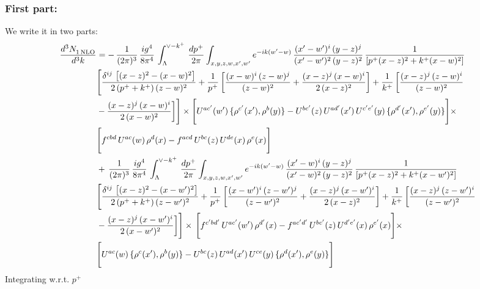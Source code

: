 \documentclass[9pt]{article}
\numberwithin{equation}{section}
\begin{document}
\subsubsection{First part:\,}
{\color{red}We write it in two parts:} 
\begin{align}
    \frac{d^{3}N_{1\,\rm NLO}^{\rm}}{d^{3}k}  & = -\,\frac{1}{(2\pi)^{3}}\, \frac{ig^{4}}{8\pi^{4}}\, \int_{\Lambda}^{\vee-k^{+}}\, \frac{dp^{+}}{2\pi}\int_{x,y,z,w,x',w^{\prime}} e^{-ik(w^{\prime}-w)}\, \frac{(x'-w')^{i}\,(y-z)^{j}}{(x'-w')^{2}\,(y-z)^{2}}\,\frac{1}{\left[p^{+}(x-z)^{2}+k^{+}(x-w)^{2}\right]} \notag \\ & \Bigg[\frac{\delta^{ij}\, \left[(x-z)^{2}-(x-w)^{2}\right]}{2\, (p^{+}+k^{+})\,(z-w)^{2}}+\frac{1}{p^{+}}\, \bigg[\frac{(x-w)^{i}\,(z-w)^{j}}{(z-w)^{2}}+\frac{(x-z)^{j}\,(x-w)^{i}}{2\,(x-z)^{2}}\bigg]+\frac{1}{k^{+}}\,\bigg[\frac{(x-z)^{j}\,(z-w)^{i}}{(z-w)^{2}}\notag \\ & -\frac{(x-z)^{j}\,(x-w)^{i}}{2\,(x-w)^{2}}\bigg]\Bigg]\times \Bigg[U^{ac'}(w')\,\{\rho^{c'}(x'),\rho^{b}(y)\}-U^{bc'}(z)\,U^{ad'}(x')\,U^{c'e'}(y)\, \{\rho^{d'}(x'),\rho^{e'}(y)\}\Bigg]\times \notag \\ & \Bigg[f^{cbd}\,U^{ac}(w)\,\rho^{d}(x)-f^{acd}\, U^{bc}(z)\,U^{de}(x)\,\rho^{e}(x)\Bigg]\notag \\ & +\,\frac{1}{(2\pi)^{3}}\, \frac{ig^{4}}{8\pi^{4}}\, \int_{\Lambda}^{\vee-k^{+}}\,\frac{dp^{+}}{2\pi}\int_{x,y,z,w,x',w^{\prime}} e^{-ik(w^{\prime}-w)}\, \frac{(x'-w)^{i}\,(y-z)^{j}}{(x'-w)^{2}\,(y-z)^{2}}\,\frac{1}{\left[p^{+}(x-z)^{2}+k^{+}(x-w')^{2}\right]} \notag \\ & \Bigg[\frac{\delta^{ij}\, \left[(x-z)^{2}-(x-w')^{2}\right]}{2\, (p^{+}+k^{+})\,(z-w')^{2}}+\frac{1}{p^{+}}\, \bigg[\frac{(x-w')^{i}\,(z-w')^{j}}{(z-w')^{2}}+\frac{(x-z)^{j}\,(x-w')^{i}}{2\,(x-z)^{2}}\bigg]+\frac{1}{k^{+}}\,\bigg[\frac{(x-z)^{j}\,(z-w')^{i}}{(z-w')^{2}}\notag \\ & -\frac{(x-z)^{j}\,(x-w')^{i}}{2\,(x-w')^{2}}\bigg]\Bigg]\times\,\Bigg[f^{c'bd'}\,U^{ac'}(w')\,\rho^{d'}(x)-f^{ac'd'}\, U^{bc'}(z)\,U^{d'e'}(x)\,\rho^{e'}(x)\Bigg] \times \notag \\ & \Bigg[U^{ac}(w)\,\{\rho^{c}(x'),\rho^{b}(y)\}-U^{bc}(z)\,U^{ad}(x')\,U^{ce}(y)\, \{\rho^{d}(x'),\rho^{e}(y)\}\Bigg]
\end{align}
Integrating w.r.t. $p^{+}$ 
\end{document}
